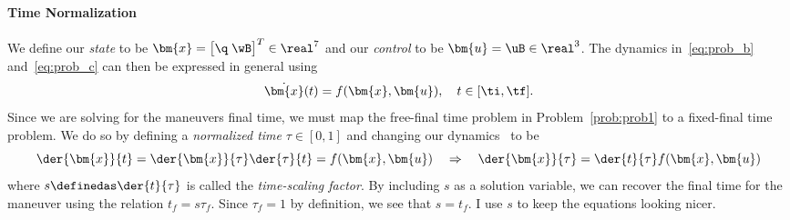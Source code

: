 \documentclass[10pt]{article}
\begin{document}
\paragraph{Time Normalization}
We define our \textit{state} to be $\bm{x} = \big[ \q \; \wB \big]^T \in \real^7$ and our \textit{control} to be $\bm{u} = \uB \in \real^3$. The dynamics in~\eqref{eq:prob_b} and~\eqref{eq:prob_c} can then be expressed in general using
\begin{equation}
\dot{\bm{x}}(t) = f(\bm{x},\bm{u}), \quad t \in [\ti,\tf].
\label{eq:dynamics_general}
\end{equation}
Since we are solving for the maneuvers final time, we must map the free-final time problem in Problem~\ref{prob:prob1} to a fixed-final time problem. We do so by defining a \textit{normalized time} $\tau\in[0,1]$ and changing our dynamics~ to be
\begin{equation}
\der{\bm{x}}{t} = \der{\bm{x}}{\tau}\der{\tau}{t} = f(\bm{x},\bm{u}) \quad \Rightarrow \quad \der{\bm{x}}{\tau} = \der{t}{\tau} f(\bm{x},\bm{u})
\label{eq:dynamics_normalized}
\end{equation}
where $s \definedas \der{t}{\tau}$ is called the \textit{time-scaling factor}. By including $s$ as a solution variable, we can recover the final time for the maneuver using the relation $t_f = s \tau_f$. Since $\tau_f = 1$ by definition, we see that $s = t_f$. I use $s$ to keep the equations looking nicer.
\end{document}
